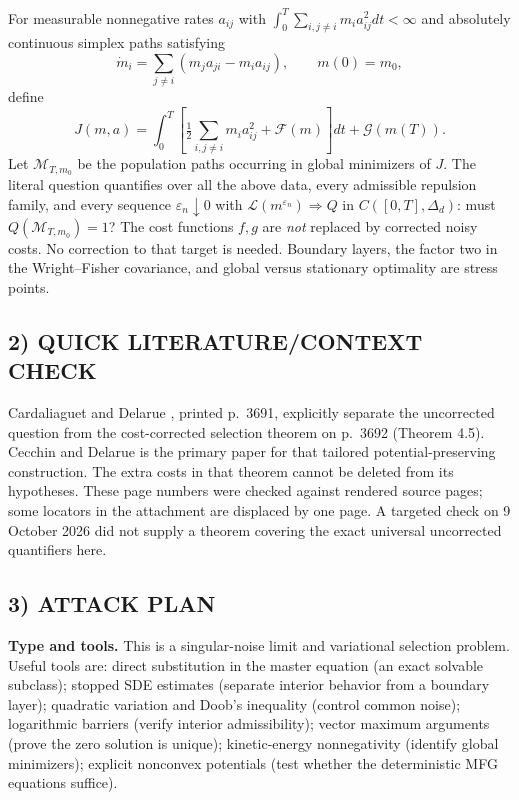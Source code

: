 \documentclass[11pt,a4paper]{article}
\theoremstyle{definition}
\theoremstyle{remark}
\begin{document}
For measurable nonnegative rates $a_{ij}$ with $\int_0^T\sum_{i,j\ne i}m_i a_{ij}^2dt<\infty$ and absolutely continuous simplex paths satisfying
\[
 \dot m_i=\sum_{j\ne i}(m_ja_{ji}-m_ia_{ij}),\qquad m(0)=m_0,
\]
define
\[
 J(m,a)=\int_0^T\left[\tfrac12\sum_{i,j\ne i}m_i a_{ij}^2+
 \mathcal F(m)\right]dt+\mathcal G(m(T)).
\]
Let $\mathcal M_{T,m_0}$ be the population paths occurring in global minimizers of $J$. The literal question quantifies over all the above data, every admissible repulsion family, and every sequence $\varepsilon_n\downarrow0$ with $\mathcal L(m^{\varepsilon_n})\Rightarrow Q$ in $C([0,T],\Delta_d)$: must $Q(\mathcal M_{T,m_0})=1$? The cost functions $f,g$ are \emph{not} replaced by corrected noisy costs. No correction to that target is needed. Boundary layers, the factor two in the Wright--Fisher covariance, and global versus stationary optimality are stress points.

\subsection*{2) QUICK LITERATURE/CONTEXT CHECK}
Cardaliaguet and Delarue \cite{cardaliaguet-delarue}, printed p.~3691, explicitly separate the uncorrected question from the cost-corrected selection theorem on p.~3692 (Theorem 4.5). Cecchin and Delarue \cite{cecchin-delarue} is the primary paper for that tailored potential-preserving construction. The extra costs in that theorem cannot be deleted from its hypotheses. These page numbers were checked against rendered source pages; some locators in the attachment are displaced by one page. A targeted check on 9 October 2026 did not supply a theorem covering the exact universal uncorrected quantifiers here.

\subsection*{3) ATTACK PLAN}
\textbf{Type and tools.} This is a singular-noise limit and variational selection problem. Useful tools are: direct substitution in the master equation (an exact solvable subclass); stopped SDE estimates (separate interior behavior from a boundary layer); quadratic variation and Doob's inequality (control common noise); logarithmic barriers (verify interior admissibility); vector maximum arguments (prove the zero solution is unique); kinetic-energy nonnegativity (identify global minimizers); explicit nonconvex potentials (test whether the deterministic MFG equations suffice).
\end{document}

